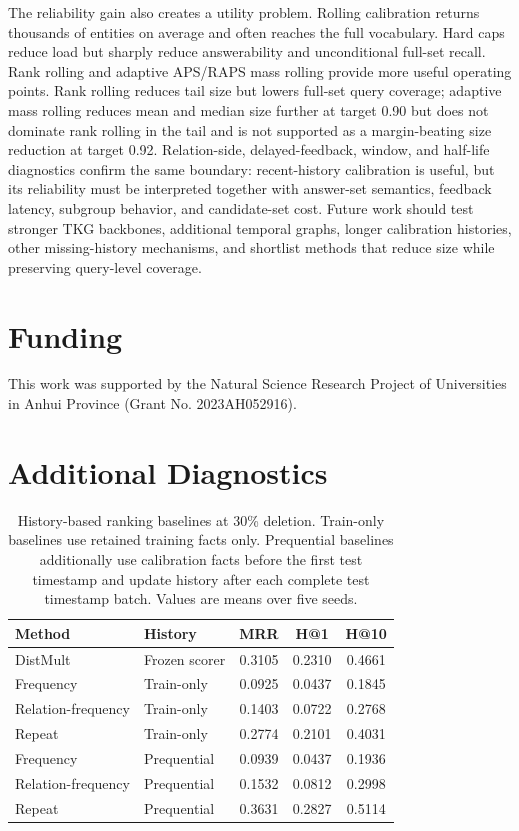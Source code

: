 \documentclass[10pt,twocolumn]{article}
\begin{document}
The reliability gain also creates a utility problem. Rolling calibration
returns thousands of entities on average and often reaches the full vocabulary.
Hard caps reduce load but sharply reduce answerability and unconditional
full-set recall. Rank rolling and adaptive APS/RAPS mass rolling provide more
useful operating points. Rank rolling reduces tail size but lowers full-set
query coverage; adaptive mass rolling reduces mean and median size further at
target 0.90 but does not dominate rank rolling in the tail and is not supported
as a margin-beating size reduction at target 0.92. Relation-side,
delayed-feedback, window, and half-life diagnostics confirm the same boundary:
recent-history calibration is useful, but its reliability must be interpreted
together with answer-set semantics, feedback latency, subgroup behavior, and
candidate-set cost. Future work should test stronger TKG backbones, additional
temporal graphs, longer calibration histories, other missing-history mechanisms,
and shortlist methods that reduce size while preserving query-level coverage.

\section*{Funding}

This work was supported by the Natural Science Research Project of Universities
in Anhui Province (Grant No. 2023AH052916).

\appendix

\section{Additional Diagnostics}
\label{app:protocol}

\begin{table}[t]
\centering
\caption{History-based ranking baselines at 30\% deletion. Train-only
baselines use retained training facts only. Prequential baselines additionally
use calibration facts before the first test timestamp and update history after
each complete test timestamp batch. Values are means over five seeds.}
\label{tab:history-baselines}
\scriptsize
\setlength{\tabcolsep}{2pt}
\begin{tabular}{@{}llccc@{}}
\toprule
Method & History & MRR & H@1 & H@10\\
\midrule
DistMult & Frozen scorer & 0.3105 & 0.2310 & 0.4661\\
Frequency & Train-only & 0.0925 & 0.0437 & 0.1845\\
Relation-frequency & Train-only & 0.1403 & 0.0722 & 0.2768\\
Repeat & Train-only & 0.2774 & 0.2101 & 0.4031\\
Frequency & Prequential & 0.0939 & 0.0437 & 0.1936\\
Relation-frequency & Prequential & 0.1532 & 0.0812 & 0.2998\\
Repeat & Prequential & 0.3631 & 0.2827 & 0.5114\\
\bottomrule
\end{tabular}
\end{table}
\end{document}
